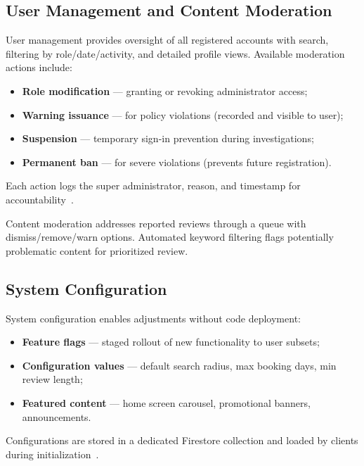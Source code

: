 \subsection{User Management and Content Moderation}
\label{subsec:user-management}

User management provides oversight of all registered accounts with search, filtering by role/date/activity, and detailed profile views.
Available moderation actions include:

\begin{itemize}
  \item \textbf{Role modification} --- granting or revoking administrator access;
  \item \textbf{Warning issuance} --- for policy violations (recorded and visible to user);
  \item \textbf{Suspension} --- temporary sign-in prevention during investigations;
  \item \textbf{Permanent ban} --- for severe violations (prevents future registration).
\end{itemize}

Each action logs the super administrator, reason, and timestamp for accountability~\cite{martin2017}.

Content moderation addresses reported reviews through a queue with dismiss/remove/warn options.
Automated keyword filtering flags potentially problematic content for prioritized review.

\subsection{System Configuration}
\label{subsec:system-config}

System configuration enables adjustments without code deployment:
\begin{itemize}
  \item \textbf{Feature flags} --- staged rollout of new functionality to user subsets;
  \item \textbf{Configuration values} --- default search radius, max booking days, min review length;
  \item \textbf{Featured content} --- home screen carousel, promotional banners, announcements.
\end{itemize}

Configurations are stored in a dedicated Firestore collection and loaded by clients during initialization~\cite{firebase_functions2024}.


